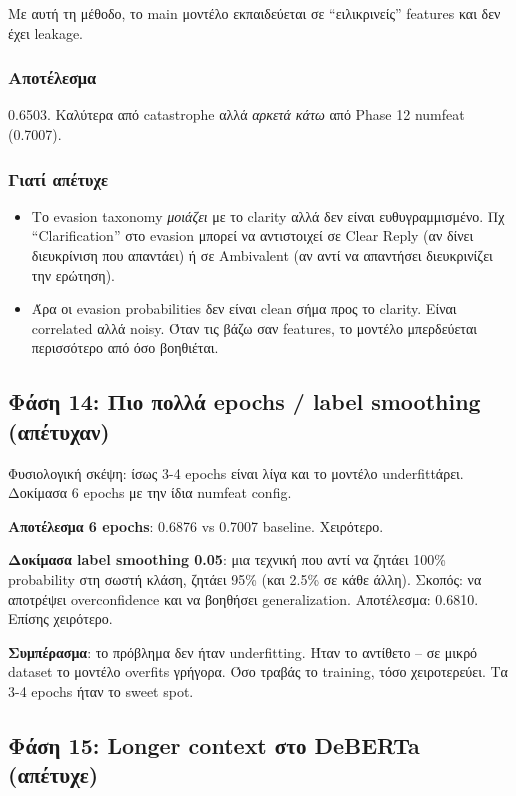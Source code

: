 \documentclass[12pt]{fphw}
\begin{document}
Με αυτή τη μέθοδο, το main μοντέλο εκπαιδεύεται σε ``ειλικρινείς'' features και δεν έχει leakage.

\subsubsection{Αποτέλεσμα}

0.6503. Καλύτερα από catastrophe αλλά \emph{αρκετά κάτω} από Phase 12 numfeat (0.7007).

\subsubsection{Γιατί απέτυχε}

\begin{itemize}
    \item Το evasion taxonomy \emph{μοιάζει} με το clarity αλλά δεν είναι ευθυγραμμισμένο. Πχ ``Clarification'' στο evasion μπορεί να αντιστοιχεί σε Clear Reply (αν δίνει διευκρίνιση που απαντάει) ή σε Ambivalent (αν αντί να απαντήσει διευκρινίζει την ερώτηση).
    \item Άρα οι evasion probabilities δεν είναι clean σήμα προς το clarity. Είναι correlated αλλά noisy. Όταν τις βάζω σαν features, το μοντέλο μπερδεύεται περισσότερο από όσο βοηθιέται.
\end{itemize}

\subsection{Φάση 14: Πιο πολλά epochs / label smoothing (απέτυχαν)}

Φυσιολογική σκέψη: ίσως 3-4 epochs είναι λίγα και το μοντέλο underfittάρει. Δοκίμασα 6 epochs με την ίδια numfeat config.

\textbf{Αποτέλεσμα 6 epochs}: 0.6876 vs 0.7007 baseline. Χειρότερο.

\textbf{Δοκίμασα label smoothing 0.05}: μια τεχνική που αντί να ζητάει 100\% probability στη σωστή κλάση, ζητάει 95\% (και 2.5\% σε κάθε άλλη). Σκοπός: να αποτρέψει overconfidence και να βοηθήσει generalization. Αποτέλεσμα: 0.6810. Επίσης χειρότερο.

\textbf{Συμπέρασμα}: το πρόβλημα δεν ήταν underfitting. Ήταν το αντίθετο -- σε μικρό dataset το μοντέλο overfits γρήγορα. Όσο τραβάς το training, τόσο χειροτερεύει. Τα 3-4 epochs ήταν το sweet spot.

\subsection{Φάση 15: Longer context στο DeBERTa (απέτυχε)}
\end{document}
